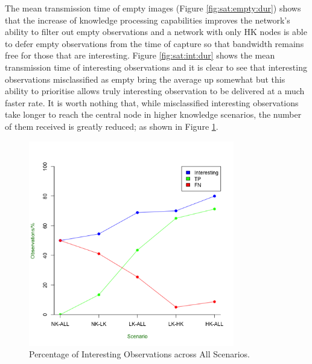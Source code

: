 The mean transmission time of empty images (Figure \ref{fig:sat:empty:dur}) shows that the increase of knowledge processing capabilities improves the network's ability to filter out empty observations and a network with only HK nodes is able to defer empty observations from the time of capture so that bandwidth remains free for those that are interesting. Figure \ref{fig:sat:int:dur} shows the mean transmission time of interesting observations and it is clear to see that interesting observations misclassified as empty bring the average up somewhat but this ability to prioritise allows truly interesting observation to be delivered at a much faster rate. It is worth nothing that, while misclassified interesting observations take longer to reach the central node in higher knowledge scenarios, the number of them received is greatly reduced; as shown in Figure \ref{fig:sat:int:percent}.

	\begin{figure}[h]
	\centering
	\includegraphics[width=0.8\textwidth]{Chap7/figures/saturated/int_percent}
	\caption{Percentage of Interesting Observations across All Scenarios.}
	\label{fig:sat:int:percent}
	\end{figure}

